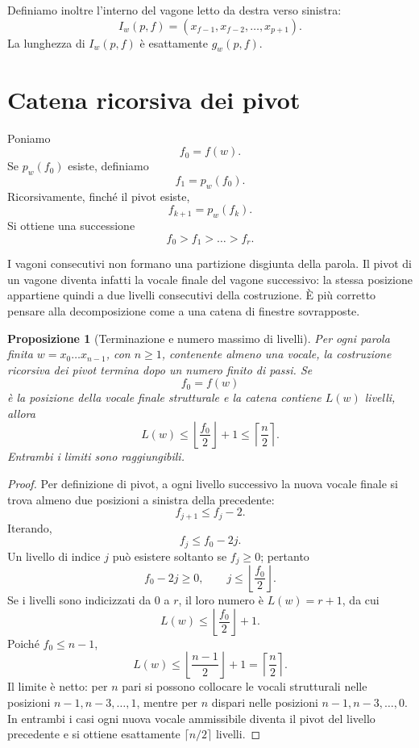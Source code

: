 \documentclass[11pt,a4paper]{article}
\newtheorem{proposizione}[teorema]{Proposizione}
\theoremstyle{definition}
\theoremstyle{remark}
\newcommand{\Pivot}{p_w}
\newcommand{\Gap}{g_w}
\begin{document}
Definiamo inoltre l'interno del vagone letto da destra verso sinistra:
\[
  I_w(p,f)=(x_{f-1},x_{f-2},\dots,x_{p+1}).
\]
La lunghezza di $I_w(p,f)$ è esattamente $\Gap(p,f)$.

\section{Catena ricorsiva dei pivot}

Poniamo
\[
  f_0=f(w).
\]
Se $\Pivot(f_0)$ esiste, definiamo
\[
  f_1=\Pivot(f_0).
\]
Ricorsivamente, finché il pivot esiste,
\[
  f_{k+1}=\Pivot(f_k).
\]
Si ottiene una successione
\[
  f_0>f_1>\dots>f_r.
\]

I vagoni consecutivi non formano una partizione disgiunta della parola. Il pivot di un vagone diventa infatti la vocale finale del vagone successivo: la stessa posizione appartiene quindi a due livelli consecutivi della costruzione. È più corretto pensare alla decomposizione come a una catena di finestre sovrapposte.

\begin{proposizione}[Terminazione e numero massimo di livelli]
Per ogni parola finita $w=x_0\dots x_{n-1}$, con $n\geq 1$, contenente almeno una vocale, la costruzione ricorsiva dei pivot termina dopo un numero finito di passi. Se
\[
  f_0=f(w)
\]
è la posizione della vocale finale strutturale e la catena contiene $L(w)$ livelli, allora
\[
  L(w)\leq \left\lfloor\frac{f_0}{2}\right\rfloor+1
  \leq \left\lceil\frac{n}{2}\right\rceil.
\]
Entrambi i limiti sono raggiungibili.
\end{proposizione}

\begin{proof}
Per definizione di pivot, a ogni livello successivo la nuova vocale finale si trova almeno due posizioni a sinistra della precedente:
\[
  f_{j+1}\leq f_j-2.
\]
Iterando,
\[
  f_j\leq f_0-2j.
\]
Un livello di indice $j$ può esistere soltanto se $f_j\geq0$; pertanto
\[
  f_0-2j\geq0,
  \qquad
  j\leq\left\lfloor\frac{f_0}{2}\right\rfloor.
\]
Se i livelli sono indicizzati da $0$ a $r$, il loro numero è $L(w)=r+1$, da cui
\[
  L(w)\leq\left\lfloor\frac{f_0}{2}\right\rfloor+1.
\]
Poiché $f_0\leq n-1$,
\[
  L(w)\leq\left\lfloor\frac{n-1}{2}\right\rfloor+1
  =\left\lceil\frac{n}{2}\right\rceil.
\]
Il limite è netto: per $n$ pari si possono collocare le vocali strutturali nelle posizioni
$n-1,n-3,\dots,1$, mentre per $n$ dispari nelle posizioni
$n-1,n-3,\dots,0$. In entrambi i casi ogni nuova vocale ammissibile diventa il pivot del livello precedente e si ottiene esattamente $\lceil n/2\rceil$ livelli.
\end{proof}
\end{document}
